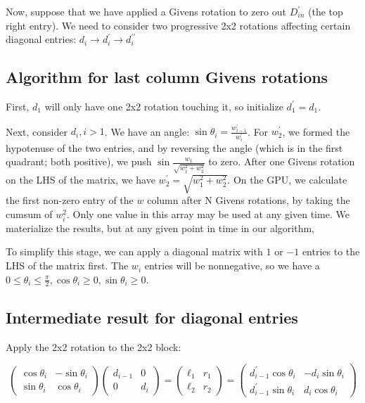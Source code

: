 \documentclass{article}
\begin{document}
Now, suppose that we have applied a Givens rotation to zero out $D^\prime_{in}$ (the top right entry). We need to consider two progressive 2x2 rotations affecting certain diagonal entries: $d_i \to d_i^\prime \to d_i^{\prime\prime}$

\subsection*{Algorithm for last column Givens rotations}

First, $d_1$ will only have one 2x2 rotation touching it, so initialize $d_1^\prime = d_1$.

Next, consider $d_i, i > 1$. We have an angle: $\sin \theta_i = \frac{w_{i-1}^\prime}{w_i^\prime}$. For $w_2^\prime$, we formed the hypotenuse of the two entries, and by reversing the angle (which is in the first quadrant; both positive), we push $\sin \frac{w_1}{\sqrt{w_1^2+w_2^2}}$ to zero. After one Givens rotation on the LHS of the matrix, we have $w_2^\prime = \sqrt{w_1^2 + w_2^2}$. On the GPU, we calculate the first non-zero entry of the $w$ column after N Givens rotations, by taking the cumsum of $w_i^2$. Only one value in this array may be used at any given time. We materialize the results, but at any given point in time in our algorithm, 

To simplify this stage, we can apply a diagonal matrix with $1$ or $-1$ entries to the LHS of the matrix first. The $w_i$ entries will be nonnegative, so we have a $0 \le \theta_i \le \frac{\pi}{2}, \cos\theta_i \ge 0, \sin\theta_i \ge 0$.

\subsection*{Intermediate result for diagonal entries}

Apply the 2x2 rotation to the 2x2 block:

$$
\left(
\begin{matrix}
\cos \theta_i & -\sin\theta_i \\
\sin\theta_i & \cos\theta_i
\end{matrix}
\right)
\left(\begin{matrix}
d_{i-1} & 0 \\
0 & d_i \end{matrix}\right)
=
\left(\begin{matrix}
	\ell_1 & r_1 \\ \ell_2 & r_2
\end{matrix}\right)
=
\left(\begin{matrix}
	d_{i-1}^\prime\cos\theta_i
	&
	-d_i \sin\theta_i
	\\
	d_{i-1}^\prime\sin\theta_i
	&
	d_i\cos\theta_i
\end{matrix}\right)
$$
\end{document}
